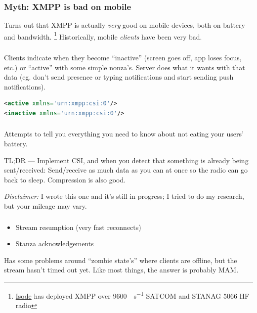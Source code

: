 \documentclass[xelatex,aspectratio=169]{beamer}
\begin{document}
\begin{frame}
	\frametitle{Myth: XMPP is bad on mobile}
	Turns out that XMPP is actually \emph{very} good on mobile devices, both on
	battery and bandwidth.%
	\footnote{\href{https://www.isode.com/whitepapers/xmpp-constrained-bandwidth.html}{Isode}
	has deployed XMPP over \SI[per-mode=symbol]{9600}{\bit\per\second} SATCOM and
	STANAG 5066 HF radio} Historically, mobile \emph{clients} have been very bad.
\end{frame}

\begin{frame}[fragile]
	\frametitle{}
	Clients indicate when they become ``inactive'' (screen goes off, app loses
	focus, etc.) or ``active'' with some simple nonza's. Server does what it wants
	with that data (eg. don't send presence or typing notifications and start
	sending push notifications).
	\vspace*{\fill}
\begin{lstlisting}[frame=single,language=xml]
<active xmlns='urn:xmpp:csi:0'/>
<inactive xmlns='urn:xmpp:csi:0'/>
\end{lstlisting}
\vspace*{\fill}
\end{frame}

\begin{frame}
	\frametitle{}
	\begin{flushleft}
		Attempts to tell you everything you need to know about not eating your
		users' battery.
	\end{flushleft}
	\begin{flushleft}
		TL;DR --- Implement CSI, and when you detect that something is already being
		sent/received: Send/receive as much data as you can at once so the radio can
		go back to sleep. Compression is also good.
	\end{flushleft}
	\begin{flushleft}
		\emph{Disclaimer:} I wrote this one and it's still in progress; I tried to
		do my research, but your mileage may vary.
	\end{flushleft}
\end{frame}

\begin{frame}
	\frametitle{}
	\begin{itemize}
		\item Stream resumption (very fast reconnects)
		\item Stanza acknowledgements
	\end{itemize}

	Has some problems around ``zombie state's'' where clients are offline, but the
	stream hasn't timed out yet. Like most things, the answer is probably MAM.
\end{frame}
\end{document}
